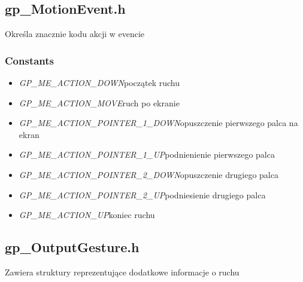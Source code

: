 \subsection{gp_MotionEvent.h}
Określa znacznie kodu akcji w evencie
\subsubsection{Constants}
\begin{itemize}
\item \textit{GP_ME_ACTION_DOWN}\qquad początek ruchu
\item \textit{GP_ME_ACTION_MOVE}\qquad ruch po ekranie
\item \textit{GP_ME_ACTION_POINTER_1_DOWN}\qquad opuszczenie pierwszego palca na ekran
\item \textit{GP_ME_ACTION_POINTER_1_UP}\qquad podnienienie pierwszego palca
\item \textit{GP_ME_ACTION_POINTER_2_DOWN}\qquad opuszczenie drugiego palca
\item \textit{GP_ME_ACTION_POINTER_2_UP}\qquad podniesienie drugiego palca
\item \textit{GP_ME_ACTION_UP}\qquad koniec ruchu
\end{itemize}

\subsection{gp_OutputGesture.h}
Zawiera struktury reprezentujące dodatkowe informacje o ruchu
